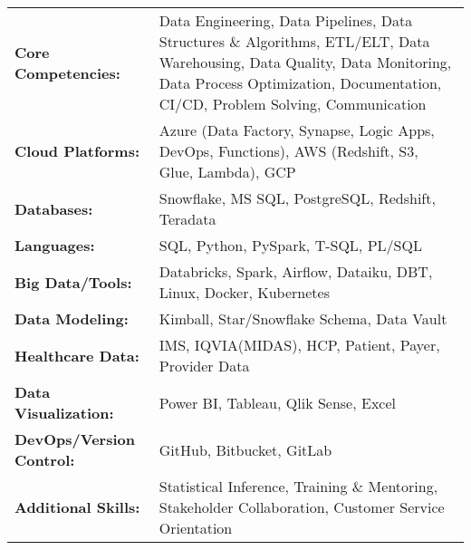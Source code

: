 \begin{onecolentry}
    \begin{tabularx}{\linewidth}{l X}
        \textbf{Core Competencies:} & Data Engineering, Data Pipelines, Data Structures \& Algorithms, ETL/ELT, Data Warehousing, Data Quality, Data Monitoring, Data Process Optimization, Documentation, CI/CD, Problem Solving, Communication \\
        \textbf{Cloud Platforms:} & Azure (Data Factory, Synapse, Logic Apps, DevOps, Functions), AWS (Redshift, S3, Glue, Lambda), GCP \\
        \textbf{Databases:} & Snowflake, MS SQL, PostgreSQL, Redshift, Teradata \\
        \textbf{Languages:} & SQL, Python, PySpark, T-SQL, PL/SQL \\
        \textbf{Big Data/Tools:} & Databricks, Spark, Airflow, Dataiku, DBT, Linux, Docker, Kubernetes \\
        \textbf{Data Modeling:} & Kimball, Star/Snowflake Schema, Data Vault \\
        \textbf{Healthcare Data:} & IMS, IQVIA(MIDAS), HCP, Patient, Payer, Provider Data \\
        \textbf{Data Visualization:} & Power BI, Tableau, Qlik Sense, Excel \\
        \textbf{DevOps/Version Control:} & GitHub, Bitbucket, GitLab \\
        \textbf{Additional Skills:} & Statistical Inference, Training \& Mentoring, Stakeholder Collaboration, Customer Service Orientation \\
    \end{tabularx}
\end{onecolentry}